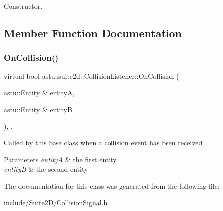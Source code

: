 Constructor. 

\subsection{Member Function Documentation}
\mbox{\label{classastu_1_1suite2d_1_1CollisionListener_a784ca22e86d659d042aaab818c488a56}} 
\subsubsection{\texorpdfstring{On\+Collision()}{OnCollision()}}
{\footnotesize\ttfamily virtual bool astu\+::suite2d\+::\+Collision\+Listener\+::\+On\+Collision (\begin{DoxyParamCaption}\item[{\hyperlink{classastu_1_1Entity}{astu\+::\+Entity} \&}]{entityA,  }\item[{\hyperlink{classastu_1_1Entity}{astu\+::\+Entity} \&}]{entityB }\end{DoxyParamCaption})\hspace{0.3cm}{\ttfamily [inline]}, {\ttfamily [protected]}, {\ttfamily [virtual]}}

Called by this base class when a collision event has been received


\begin{DoxyParams}{Parameters}
{\em entityA} & the first entity \\
\hline
{\em entityB} & the second entity \\
\hline
\end{DoxyParams}


The documentation for this class was generated from the following file\+:\begin{DoxyCompactItemize}
\item 
include/\+Suite2\+D/Collision\+Signal.\+h\end{DoxyCompactItemize}
